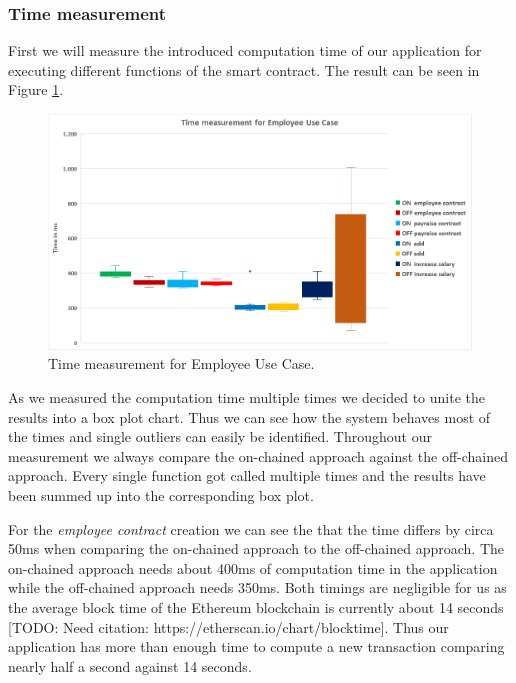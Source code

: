 \subsubsection{Time measurement}
First we will measure the introduced computation time of our application for executing different functions of the smart contract. The result can be seen in Figure \ref{fig:05_time}.

\begin{figure}[t]%
\centering
\includegraphics[width=1.0\textwidth]{images/05_evaluation/05_time.png}
\caption{\label{fig:05_time}Time measurement for Employee Use Case.}
\end{figure}

As we measured the computation time multiple times we decided to unite the results into a box plot chart. Thus we can see how the system behaves most of the times and single outliers can easily be identified. Throughout our measurement we always compare the on-chained approach against the off-chained approach. Every single function got called multiple times and the results have been summed up into the corresponding box plot.

For the \textit{employee contract} creation we can see the that the time differs by circa 50ms when comparing the on-chained approach to the off-chained approach. The on-chained approach needs about 400ms of computation time in the application while the off-chained approach needs 350ms. Both timings are negligible for us as the average block time of the Ethereum blockchain is currently about 14 seconds [TODO: Need citation: https://etherscan.io/chart/blocktime]. Thus our application has more than enough time to compute a new transaction comparing nearly half a second against 14 seconds.

